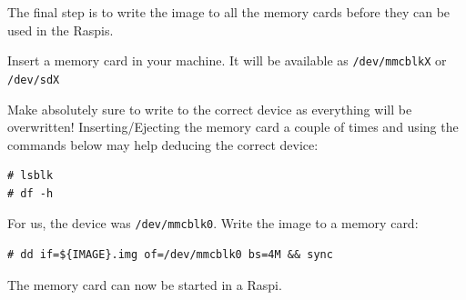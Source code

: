 The final step is to write the image to all the memory cards before they can
be used in the \ac{Raspi}s.



Insert a memory card in your machine. It will be available as
\texttt{/dev/mmcblkX} or \texttt{/dev/sdX}

Make absolutely sure to write to the correct device as everything will be 
overwritten!
Inserting/Ejecting the memory card a couple of times and using the commands
below may help deducing the correct device:

\begin{lstlisting}[]
# lsblk
# df -h
\end{lstlisting}
\FloatBarrier
\vspace{-5mm}

For us, the device was \texttt{/dev/mmcblk0}. Write the image to a memory card:
\begin{lstlisting}[]
# dd if=${IMAGE}.img of=/dev/mmcblk0 bs=4M && sync
\end{lstlisting}
\FloatBarrier
\vspace{-5mm}

The memory card can now be started in a \ac{Raspi}.

